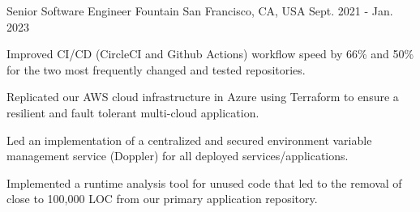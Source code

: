 
\begin{cventries}

  \cventry
  {Senior Software Engineer} %
  {Fountain} %
  {San Francisco, CA, USA} %
  {Sept. 2021 - Jan. 2023} %
  {
    \begin{cvitems} %
      \item {Improved CI/CD (CircleCI and Github Actions) workflow speed by 66\% and 50\% for the two most frequently changed and tested repositories.}
      \item {Replicated our AWS cloud infrastructure in Azure using Terraform to ensure a resilient and fault tolerant multi-cloud application.}
      \item {Led an implementation of a centralized and secured environment variable management service (Doppler) for all deployed services/applications.}
      \item {Implemented a runtime analysis tool for unused code that led to the removal of close to 100,000 LOC from our primary application repository.}
    \end{cvitems}
  }



\end{cventries}
